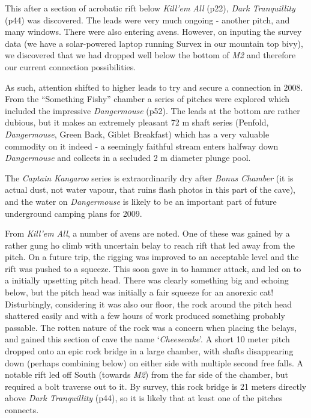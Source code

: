This after a section of acrobatic rift below \emph{Kill'em All} (p22),
\emph{Dark Tranquillity} (p44) was discovered. The leads were very much
ongoing - another pitch, and many windows. There were also entering
avens. However, on inputing the survey data (we have a solar-powered
laptop running Survex in our mountain top bivy), we discovered that we
had dropped well below the bottom of \emph{M2} and therefore our current
connection possibilities.

As such, attention shifted to higher leads to try and secure a
connection in 2008. From the ``Something Fishy'' chamber a series of
pitches were explored which included the impressive \emph{Dangermouse}
(p52). The leads at the bottom are rather dubious, but it makes an
extremely pleasant 72 m shaft series (Penfold, \emph{Dangermouse}, Green
Back, Giblet Breakfast) which has a very valuable commodity on it indeed
- a seemingly faithful stream enters halfway down \emph{Dangermouse} and
collects in a secluded 2 m diameter plunge pool.

The \emph{Captain Kangaroo} series is extraordinarily dry after
\emph{Bonus Chamber} (it is actual dust, not water vapour, that ruins
flash photos in this part of the cave), and the water on
\emph{Dangermouse} is likely to be an important part of future
underground camping plans for 2009.

From \emph{Kill'em All}, a number of avens are noted. One of these was
gained by a rather gung ho climb with uncertain belay to reach rift that
led away from the pitch. On a future trip, the rigging was improved to
an acceptable level and the rift was pushed to a squeeze. This soon gave
in to hammer attack, and led on to a initially upsetting pitch head.
There was clearly something big and echoing below, but the pitch head
was initially a fair squeeze for an anorexic cat! Disturbingly,
considering it was also our floor, the rock around the pitch head
shattered easily and with a few hours of work produced something
probably passable. The rotten nature of the rock was a concern when
placing the belays, and gained this section of cave the name
`\emph{Cheesecake}'. A short 10 meter pitch dropped onto an epic rock
bridge in a large chamber, with shafts disappearing down (perhaps
combining below) on either side with multiple second free falls. A
notable rift led off South (towards \emph{M2}) from the far side of the
chamber, but required a bolt traverse out to it. By survey, this rock
bridge is 21 meters directly above \emph{Dark Tranquillity} (p44), so it
is likely that at least one of the pitches connects.

